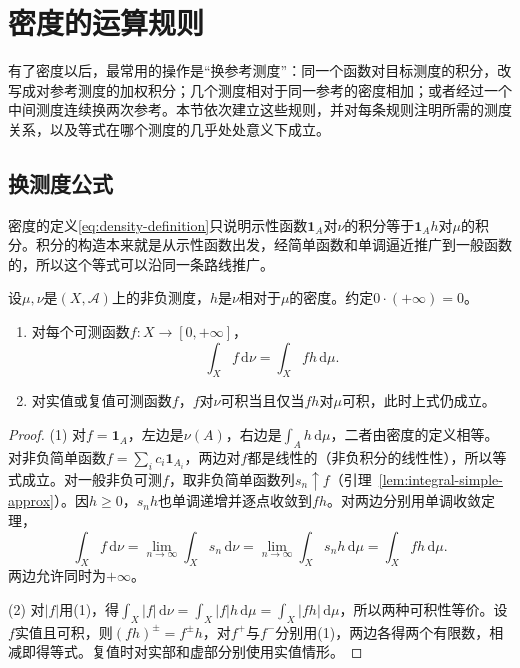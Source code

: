 \section{密度的运算规则}
\label{sec:density-rules}

有了密度以后，最常用的操作是“换参考测度”：同一个函数对目标测度的积分，改写成对参考测度的加权积分；几个测度相对于同一参考的密度相加；或者经过一个中间测度连续换两次参考。本节依次建立这些规则，并对每条规则注明所需的测度关系，以及等式在哪个测度的几乎处处意义下成立。

\subsection{换测度公式}
\label{sec:density-change-of-measure}

密度的定义\eqref{eq:density-definition}只说明示性函数$\mathbf 1_A$对$\nu$的积分等于$\mathbf 1_Ah$对$\mu$的积分。积分的构造本来就是从示性函数出发，经简单函数和单调逼近推广到一般函数的，所以这个等式可以沿同一条路线推广。

\begin{theorem}[换测度公式]
\label{thm:density-change-of-measure}
设$\mu,\nu$是$(X,\mathcal A)$上的非负测度，$h$是$\nu$相对于$\mu$的密度。约定$0\cdot(+\infty)=0$。
\begin{enumerate}
 \item 对每个可测函数$f:X\to[0,+\infty]$，
 \[
  \int_Xf\,\mathrm d\nu=\int_Xfh\,\mathrm d\mu .
 \]
 \item 对实值或复值可测函数$f$，$f$对$\nu$可积当且仅当$fh$对$\mu$可积，此时上式仍成立。
\end{enumerate}
\end{theorem}

\begin{proof}
(1) 对$f=\mathbf 1_A$，左边是$\nu(A)$，右边是$\int_Ah\,\mathrm d\mu$，二者由密度的定义相等。对非负简单函数$f=\sum_ic_i\mathbf 1_{A_i}$，两边对$f$都是线性的（非负积分的线性性），所以等式成立。对一般非负可测$f$，取非负简单函数列$s_n\uparrow f$（引理~\ref{lem:integral-simple-approx}）。因$h\ge0$，$s_nh$也单调递增并逐点收敛到$fh$。对两边分别用单调收敛定理，
\[
 \int_Xf\,\mathrm d\nu=\lim_{n\to\infty}\int_Xs_n\,\mathrm d\nu=\lim_{n\to\infty}\int_Xs_nh\,\mathrm d\mu=\int_Xfh\,\mathrm d\mu .
\]
两边允许同时为$+\infty$。

(2) 对$|f|$用(1)，得$\int_X|f|\,\mathrm d\nu=\int_X|f|h\,\mathrm d\mu=\int_X|fh|\,\mathrm d\mu$，所以两种可积性等价。设$f$实值且可积，则$(fh)^\pm=f^\pm h$，对$f^+$与$f^-$分别用(1)，两边各得两个有限数，相减即得等式。复值时对实部和虚部分别使用实值情形。
\end{proof}

